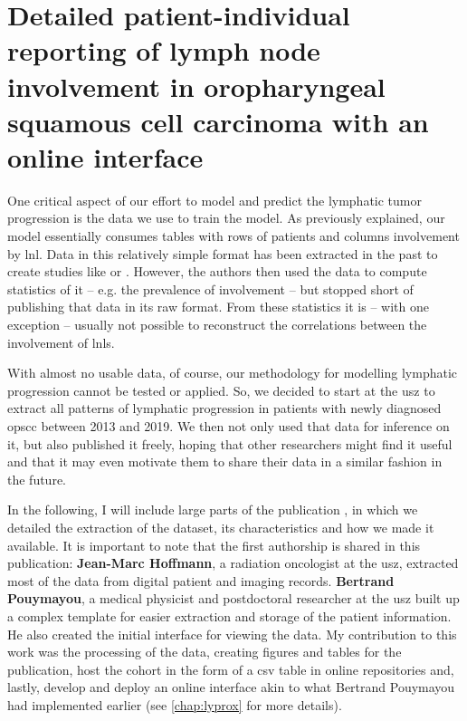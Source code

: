 \documentclass[\relativeRoot/main.tex]{subfiles}
\begin{document}
\chapter[Detailed reporting of involvement in OPSCC]{Detailed patient-individual reporting of lymph node involvement in oropharyngeal squamous cell carcinoma with an online interface}
\label{chap:dataset}

One critical aspect of our effort to model and predict the lymphatic tumor progression is the data we use to train the model. As previously explained, our model essentially consumes tables with rows of patients and columns involvement by \gls{lnl}. Data in this relatively simple format has been extracted in the past to create studies like \cite{candela_patterns_1990} or \cite{shah_patterns_1990}. However, the authors then used the data to compute statistics of it -- e.g. the prevalence of involvement -- but stopped short of publishing that data in its raw format. From these statistics it is -- with one exception \cite{sanguineti_defining_2009} -- usually not possible to reconstruct the correlations between the involvement of \glspl{lnl}.

With almost no usable data, of course, our methodology for modelling lymphatic progression cannot be tested or applied. So, we decided to start at the \gls{usz} to extract all patterns of lymphatic progression in patients with newly diagnosed \gls{opscc} between 2013 and 2019. We then not only used that data for inference on it, but also published it freely, hoping that other researchers might find it useful and that it may even motivate them to share their data in a similar fashion in the future.

In the following, I will include large parts of the publication \cite{ludwig_detailed_2022}, in which we detailed the extraction of the dataset, its characteristics and how we made it available. It is important to note that the first authorship is shared in this publication: \textbf{Jean-Marc Hoffmann}, a radiation oncologist at the \gls{usz}, extracted most of the data from digital patient and imaging records. \textbf{Bertrand Pouymayou}, a medical physicist and postdoctoral researcher at the \gls{usz} built up a complex template for easier extraction and storage of the patient information. He also created the initial interface for viewing the data. My contribution to this work was the processing of the data, creating figures and tables for the publication, host the cohort in the form of a \gls{csv} table in online repositories and, lastly, develop and deploy an online interface akin to what Bertrand Pouymayou had implemented earlier (see \cref{chap:lyprox} for more details).





\end{document}
